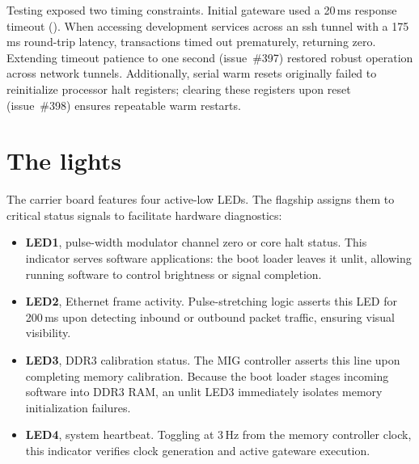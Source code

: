 \documentclass[journal,9pt]{IEEEtran}
\begin{document}
Testing exposed two timing constraints. Initial gateware used a 20\,ms response
timeout (). When accessing development services across an ssh
tunnel with a 175\,ms round-trip latency, transactions timed out prematurely,
returning zero. Extending timeout patience to one second (issue~\#397) restored
robust operation across network tunnels. Additionally, serial warm resets
originally failed to reinitialize processor halt registers; clearing these
registers upon reset (issue~\#398) ensures repeatable warm restarts.





\section{The lights}
\label{sec:f-leds}

The carrier board features four active-low LEDs. The flagship assigns them to
critical status signals to facilitate hardware diagnostics:

\begin{itemize}
\item \textbf{LED1}, pulse-width modulator channel zero or core halt status. This
  indicator serves software applications: the boot loader leaves it unlit,
  allowing running software to control brightness or signal completion.
\item \textbf{LED2}, Ethernet frame activity. Pulse-stretching logic asserts
  this LED for 200\,ms upon detecting inbound or outbound packet traffic,
  ensuring visual visibility.
\item \textbf{LED3}, DDR3 calibration status. The MIG controller asserts this
  line upon completing memory calibration. Because the boot loader stages
  incoming software into DDR3 RAM, an unlit LED3 immediately isolates memory
  initialization failures.
\item \textbf{LED4}, system heartbeat. Toggling at 3\,Hz from the memory
  controller clock, this indicator verifies clock generation and active gateware
  execution.
\end{itemize}
\end{document}
